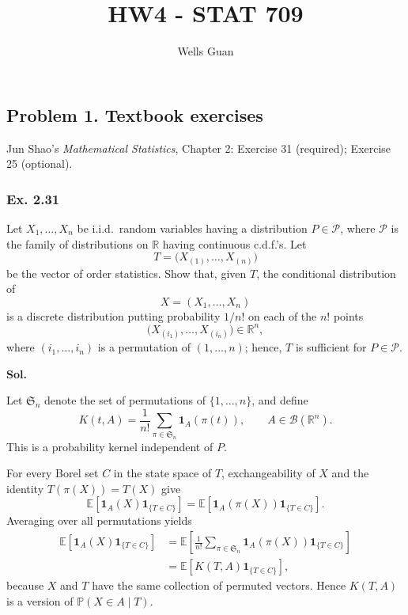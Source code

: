 \documentclass[lang=en,11pt,a4paper,citestyle=authoryear]{elegantpaper}
\title{HW4 - STAT 709}
\author{Wells Guan}
\newcommand{\R}{\mathbb{R}}
\newcommand{\E}{\mathbb{E}}
\renewcommand{\P}{\mathbb{P}}
\begin{document}
\maketitle

\subsection*{Problem 1. Textbook exercises}
Jun Shao's \textit{Mathematical Statistics}, Chapter 2:
Exercise 31 (required); Exercise 25 (optional).

\vspace{1em}

\subsubsection*{Ex. 2.31}
Let $X_1,\ldots,X_n$ be i.i.d.\ random variables having a distribution
$P\in\mathcal{P}$, where $\mathcal{P}$ is the family of distributions on
$\mathbb{R}$ having continuous c.d.f.'s. Let
\[
T=\bigl(X_{(1)},\ldots,X_{(n)}\bigr)
\]
be the vector of order statistics. Show that, given $T$, the conditional
distribution of
\[
X=(X_1,\ldots,X_n)
\]
is a discrete distribution putting probability $1/n!$ on each of the
$n!$ points
\[
\bigl(X_{(i_1)},\ldots,X_{(i_n)}\bigr)\in\mathbb{R}^n,
\]
where $(i_1,\ldots,i_n)$ is a permutation of $(1,\ldots,n)$; hence,
$T$ is sufficient for $P\in\mathcal{P}$.\par
\vspace{0.5em}
\textbf{Sol.}\par
Let $\mathfrak{S}_n$ denote the set of permutations of
$\{1,\ldots,n\}$, and define
\[
K(t,A)
=\frac{1}{n!}\sum_{\pi\in\mathfrak{S}_n}
\mathbf{1}_A(\pi(t)),
\qquad A\in\mathcal{B}(\R^n).
\]
This is a probability kernel independent of $P$.

For every Borel set $C$ in the state space of $T$, exchangeability
of $X$ and the identity $T(\pi(X))=T(X)$ give
\[
\E[\mathbf{1}_A(X)\mathbf{1}_{\{T\in C\}}]
=
\E[\mathbf{1}_A(\pi(X))\mathbf{1}_{\{T\in C\}}].
\]
Averaging over all permutations yields
\[
\begin{aligned}
\E[\mathbf{1}_A(X)\mathbf{1}_{\{T\in C\}}]
&=
\E\left[
\frac{1}{n!}\sum_{\pi\in\mathfrak{S}_n}
\mathbf{1}_A(\pi(X))\mathbf{1}_{\{T\in C\}}
\right]\\
&=
\E[K(T,A)\mathbf{1}_{\{T\in C\}}],
\end{aligned}
\]
because $X$ and $T$ have the same collection of permuted vectors.
Hence $K(T,A)$ is a version of $\P(X\in A\mid T)$.
\end{document}

